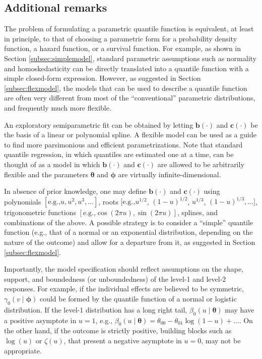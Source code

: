 \documentclass[12pt]{article}
\def\thetavec{\bm{\theta}}
\def\phivec{\bm{\phi}}
\def\bvec{\bm{b}}
\def\cvec{\bm{c}}
\begin{document}
\subsection{Additional remarks}\label{subsec:add}

The problem of formulating a parametric quantile function is equivalent, at least in principle, to that of choosing a parametric form for a probability density function, a hazard function, or a survival function. For example, as shown in Section \ref{subsec:simplemodel}, standard parametric assumptions such as normality and homoskedasticity can be directly translated into a quantile function with a simple closed-form expression. However, as suggested in Section \ref{subsec:flexmodel}, the models that can be used to describe a quantile function are often very different from most of the ``conventional'' parametric distributions, and frequently much more flexible.  


An exploratory semiparametric fit can be
obtained by letting $\bvec(\cdot)$ and $\cvec(\cdot)$ be the basis of a linear or polynomial spline. A flexible model can be used
as a guide to find more parsimonious and efficient parametrizations. Note that standard quantile regression, in which 
quantiles are estimated one at a time, can be thought of as a model in which $\bvec(\cdot)$ and $\cvec(\cdot)$ are allowed to be arbitrarily flexible
and the parameters $\thetavec$ and $\phivec$ are virtually infinite-dimensional.

In absence of prior knowledge, one may define $\bvec(\cdot)$ and $\cvec(\cdot)$ using polynomials $\left[\text{e.g.,} u, u^2, u^3, \ldots\right]$, roots $\big[\text{e.g.,} u^{1/2}$, $(1 - u)^{1/2}$, $u^{1/3}$,  $(1 - u)^{1/3}, \ldots\big]$, trigonometric functions $\left[\text{e.g.,} \cos(2\pi u), \sin(2\pi u)\right]$, splines, and combinations of the above. A possible strategy is to consider a ``simple'' quantile function (e.g., that of a normal or an exponential distribution, depending on the nature of the outcome) and allow for a departure from it, as suggested in Section \ref{subsec:flexmodel}.


Importantly, the model specification should reflect assumptions on the shape, support, and boundedness (or unboundedness) of the level-1 and level-2 responses. For example, if the individual effects are believed to be symmetric, $\gamma_0(v \mid \phivec)$ could be formed by the quantile function of a normal or logistic distribution. If the level-1 distribution has a long right tail, $\beta_0(u \mid \thetavec)$ may have a positive asymptote in $u = 1$, e.g., $\beta_0(u \mid \thetavec) = \theta_{00} - \theta_{01} \log(1 - u) + \ldots$. On the other hand, if the outcome is strictly positive, building blocks such as $\log(u)$ or $\zeta(u)$, that present a negative asymptote in $u = 0$, may not be appropriate.
\end{document}
